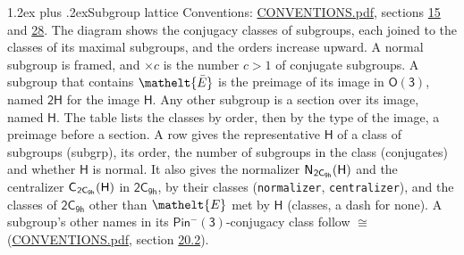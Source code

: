\documentclass[10pt,a4paper]{article}
\makeatletter
\renewcommand\section{\@startsection{section}{1}{\z@}{-3ex plus -1ex minus -.2ex}%
  {1.2ex plus .2ex}{\normalfont\large\sffamily\bfseries\color{parttitle}}}
\numberwithin{equation}{section}
\newcommand{\eltfont}[1]{{\let\sigma\eltsigma\mathelt{#1}}}
\newcommand{\grp}[1]{\mathsf{#1}}
\newcommand{\cls}[1]{\eltfont{#1}}
\newcommand{\elt}[1]{\eltfont{#1}}
\newcommand{\samecls}{\cong}
\newcommand{\barred}[1]{\bar{#1}}
\newcommand{\hairsp}{\mkern1mu}
\makeatother
\begin{document}
\section{Subgroup lattice}\label{s:subgroups}
Conventions: \href{../../CONVENTIONS.pdf}{CONVENTIONS.pdf}, sections \href{../../../rotation/CONVENTIONS.pdf\#conv.15}{15} and \href{../../CONVENTIONS.pdf\#conv.28}{28}.
The diagram shows the conjugacy classes of subgroups, each joined to the classes of its maximal subgroups, and the orders increase upward. \label{n:index.conjugates.c}A normal subgroup is framed, and ${\times}c$ is the number $c > 1$ of conjugate subgroups. \label{n:group.H}A subgroup that contains $\elt{\barred{E}}$ is the preimage of its image in $\grp{O(3)}$, named $\grp{2H}$ for the image $\grp{H}$. Any other subgroup is a section over its image, named $\grp{H}$. The table lists the classes by order, then by the type of the image, a preimage before a section. \label{n:head.subgroup}\label{n:head.order}\label{n:head.conjugates}\label{n:head.normal}A row gives the representative $\grp{H}$ of a class of subgroups (subgrp), its order, the number of subgroups in the class (conjugates) and whether $\grp{H}$ is normal. \label{n:group.normalizer}\label{n:group.centralizer}\label{n:head.classes}It also gives the normalizer $\grp{N}_{\hairsp \grp{2C_{9h}}}(\grp{H})$ and the centralizer $\grp{C}_{\hairsp \grp{2C_{9h}}}(\grp{H})$ in $\grp{2C_{9h}}$, by their classes (\texttt{normalizer}, \texttt{centralizer}), and the classes of $\grp{2C_{9h}}$ other than $\cls{E}$ met by $\grp{H}$ (classes, a dash for none). A subgroup's other names in its \href{Pinminus3.pdf}{$\grp{Pin^{-}(3)}$}-conjugacy class follow $\samecls$ (\href{../../CONVENTIONS.pdf}{CONVENTIONS.pdf}, section \href{../../CONVENTIONS.pdf\#conv.20.2}{20.2}).
\begin{center}
\end{center}
\end{document}
